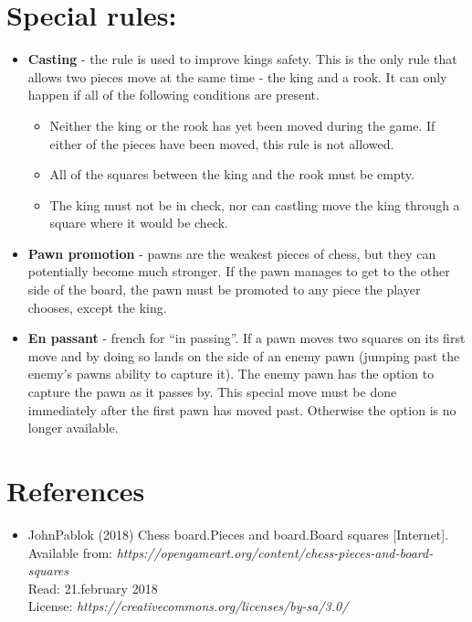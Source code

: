 \documentclass{article}
\begin{document}
\section{Special rules:}
\begin{itemize}

\item \textbf{Casting} - the rule is used to improve kings safety.  This is the only rule that allows two pieces move at the same time - the king and a rook. It can only happen if all of the following conditions are present.

\begin{itemize}
   \item Neither the king or the rook has yet been moved during the game. If either of the pieces have been moved, this rule is not allowed. 
   \item All of the squares between the king and the rook must be empty.
   \item The king must not be in check, nor can castling move the king through a square where it would be check. 
   \end{itemize}

\item \textbf{Pawn promotion} - pawns are the weakest pieces of chess, but they can potentially become much stronger. If the pawn manages to get to the other side of the board, the pawn must be promoted to any piece the player chooses, except the king. 

\item \textbf{En passant} - french for “in passing”. If a pawn moves two squares on its first move and by doing so lands on the side of an enemy pawn (jumping past the enemy’s pawns ability to capture it). The enemy pawn has the option to capture the pawn as it passes by. This special move must be done immediately after the first pawn has moved past. Otherwise the option is no longer available. 
\end{itemize}

\section{References}
\begin{itemize}
\item JohnPablok (2018) Chess board.Pieces and board.Board squares [Internet]. \\
	  Available from: \textit{https://opengameart.org/content/chess-pieces-and-board-squares} \\
	  Read: 21.february 2018\\
	  License: \textit{https://creativecommons.org/licenses/by-sa/3.0/}
\end{itemize}
\end{document}
